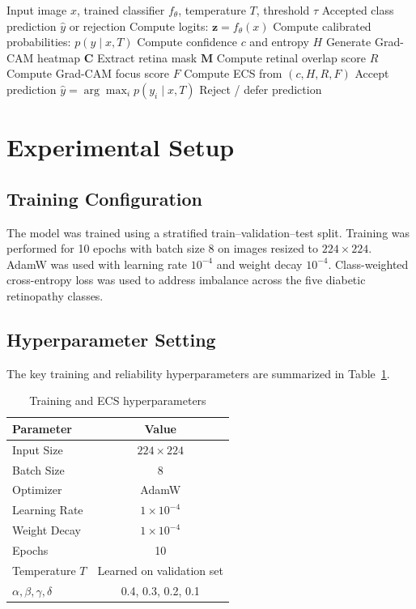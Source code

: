 \documentclass[conference]{IEEEtran}
\begin{document}
\begin{algorithm}[!t]
\caption{Retina-Aware ECS-based Selective Prediction}
\label{alg:ecs}
\begin{algorithmic}[1]
\Require Input image $x$, trained classifier $f_\theta$, temperature $T$, threshold $\tau$
\Ensure Accepted class prediction $\hat{y}$ or rejection
\State Compute logits: $\mathbf{z} = f_\theta(x)$
\State Compute calibrated probabilities: $p(y \mid x, T)$
\State Compute confidence $c$ and entropy $H$
\State Generate Grad-CAM heatmap $\mathbf{C}$
\State Extract retina mask $\mathbf{M}$
\State Compute retinal overlap score $R$
\State Compute Grad-CAM focus score $F$
\State Compute ECS from $(c,H,R,F)$
    \State Accept prediction $\hat{y} = \arg\max_i p(y_i \mid x, T)$
\Else
    \State Reject / defer prediction
\EndIf
\end{algorithmic}
\end{algorithm}

\section{Experimental Setup}

\subsection{Training Configuration}
The model was trained using a stratified train--validation--test split. Training was performed for 10 epochs with batch size 8 on images resized to $224 \times 224$. AdamW was used with learning rate $10^{-4}$ and weight decay $10^{-4}$. Class-weighted cross-entropy loss was used to address imbalance across the five diabetic retinopathy classes.

\subsection{Hyperparameter Setting}
The key training and reliability hyperparameters are summarized in Table~\ref{tab:hyperparams}.

\begin{table}[!t]
\centering
\caption{Training and ECS hyperparameters}
\label{tab:hyperparams}
\renewcommand{\arraystretch}{1.08}
\setlength{\tabcolsep}{6pt}
\begin{tabular}{lc}
\toprule
Parameter & Value \\
\midrule
Input Size & $224 \times 224$ \\
Batch Size & 8 \\
Optimizer & AdamW \\
Learning Rate & $1\times10^{-4}$ \\
Weight Decay & $1\times10^{-4}$ \\
Epochs & 10 \\
Temperature $T$ & Learned on validation set \\
$\alpha,\beta,\gamma,\delta$ & 0.4, 0.3, 0.2, 0.1 \\
\bottomrule
\end{tabular}
\end{table}
\end{document}
